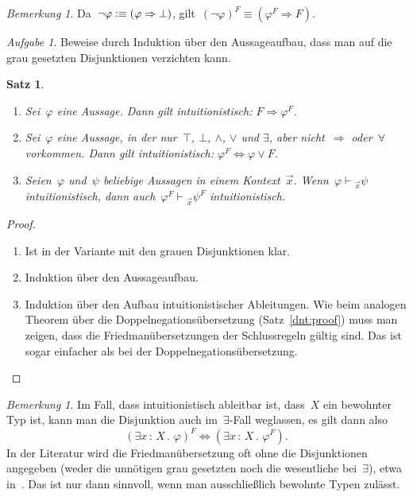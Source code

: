 \documentclass[a4paper,ngerman,12pt]{scrartcl}
\theoremstyle{definition}
\theoremstyle{plain}
\newtheorem{satz}[defn]{Satz}
\theoremstyle{remark}
\newtheorem{bem}[defn]{Bemerkung}
\newtheorem{aufg}[defn]{Aufgabe}
\newcommand{\seq}[1]{\mathrel{\vdash\!\!\!_{#1}}}
\renewcommand{\_}{\mathpunct{.}\,}
\newcommand{\?}{\,{:}\,}
\newcommand{\defequiv}{\vcentcolon\equiv}
\begin{document}
\begin{bem}Da~$\neg\varphi \defequiv (\varphi \Rightarrow \bot)$,
gilt~$(\neg\varphi)^F \equiv (\varphi^F \Rightarrow F)$.\end{bem}

\begin{aufg}Beweise durch Induktion über den Aussageaufbau, dass man auf die grau
gesetzten Disjunktionen verzichten kann.\end{aufg}

\begin{satz}\label{friedman:proof}
\begin{enumerate}
\item Sei~$\varphi$ eine Aussage. Dann gilt intuitionistisch: $F \Longrightarrow \varphi^F$.

\item Sei~$\varphi$ eine Aussage, in der nur~$\top$, $\bot$,
$\wedge$, $\vee$ und $\exists$, aber nicht~$\Rightarrow$ oder~$\forall$ vorkommen.
Dann gilt intuitionistisch: $\varphi^F \Longleftrightarrow \varphi \vee F$.

\item Seien~$\varphi$ und~$\psi$ beliebige Aussagen in einem Kontext~$\vec x$.
Wenn~$\varphi \seq{\vec x} \psi$ intuitionistisch, dann auch~$\varphi^F
\seq{\vec x} \psi^F$ intuitionistisch.
\end{enumerate}
\end{satz}
\begin{proof}
\begin{enumerate}
\item Ist in der Variante mit den grauen Disjunktionen klar.
\item Induktion über den Aussageaufbau.
\item Induktion über den Aufbau intuitionistischer Ableitungen. Wie beim
analogen Theorem über die Doppelnegationsübersetzung (Satz~\ref{dnt:proof})
muss man zeigen, dass die Friedmanübersetzungen der Schlussregeln gültig sind.
Das ist sogar einfacher als bei der Doppelnegationsübersetzung.\qedhere
\end{enumerate}
\end{proof}

\begin{bem}Im Fall, dass intuitionistisch ableitbar ist, dass~$X$ ein bewohnter
Typ ist, kann man die Disjunktion auch im~$\exists$-Fall weglassen, es gilt
dann also
\[ (\exists x\?X\_ \varphi)^F \Longleftrightarrow (\exists x\?X\_ \varphi^F).
\]
In der Literatur wird die Friedmanübersetzung oft ohne die Disjunktionen
angegeben (weder die unnötigen grau gesetzten noch die wesentliche bei~$\exists$), etwa
in~\cite{coquand:classical}. Das ist nur dann sinnvoll, wenn man ausschließlich
bewohnte Typen zulässt.
\end{bem}
\end{document}
